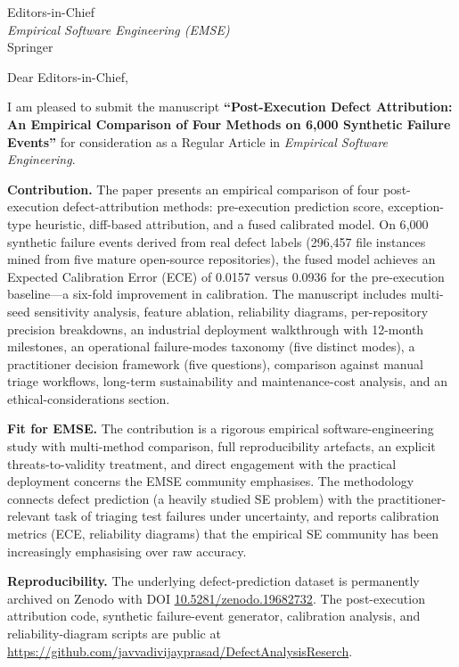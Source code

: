 \documentclass[11pt,letterpaper]{letter}
\begin{document}
\begin{letter}{Editors-in-Chief \\ \textit{Empirical Software Engineering (EMSE)} \\ Springer}

\opening{Dear Editors-in-Chief,}

I am pleased to submit the manuscript \textbf{``Post-Execution Defect Attribution: An Empirical Comparison of Four Methods on 6{,}000 Synthetic Failure Events''} for consideration as a Regular Article in \textit{Empirical Software Engineering}.

\textbf{Contribution.} The paper presents an empirical comparison of four post-execution defect-attribution methods: pre-execution prediction score, exception-type heuristic, diff-based attribution, and a fused calibrated model. On 6{,}000 synthetic failure events derived from real defect labels (296{,}457 file instances mined from five mature open-source repositories), the fused model achieves an Expected Calibration Error (ECE) of 0.0157 versus 0.0936 for the pre-execution baseline---a six-fold improvement in calibration. The manuscript includes multi-seed sensitivity analysis, feature ablation, reliability diagrams, per-repository precision breakdowns, an industrial deployment walkthrough with 12-month milestones, an operational failure-modes taxonomy (five distinct modes), a practitioner decision framework (five questions), comparison against manual triage workflows, long-term sustainability and maintenance-cost analysis, and an ethical-considerations section.

\textbf{Fit for EMSE.} The contribution is a rigorous empirical software-engineering study with multi-method comparison, full reproducibility artefacts, an explicit threats-to-validity treatment, and direct engagement with the practical deployment concerns the EMSE community emphasises. The methodology connects defect prediction (a heavily studied SE problem) with the practitioner-relevant task of triaging test failures under uncertainty, and reports calibration metrics (ECE, reliability diagrams) that the empirical SE community has been increasingly emphasising over raw accuracy.

\textbf{Reproducibility.} The underlying defect-prediction dataset is permanently archived on Zenodo with DOI \href{https://doi.org/10.5281/zenodo.19682732}{10.5281/zenodo.19682732}. The post-execution attribution code, synthetic failure-event generator, calibration analysis, and reliability-diagram scripts are public at \url{https://github.com/javvadivijayprasad/DefectAnalysisReserch}.


\end{letter}
\end{document}
